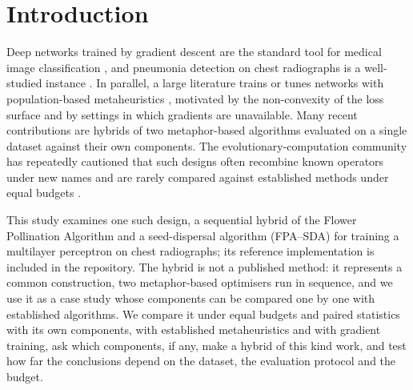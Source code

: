 \documentclass[preprint,12pt]{elsarticle}
\begin{document}
\linenumbers
\section{Introduction}\label{sec:intro}

Deep networks trained by gradient descent are the standard tool for medical image classification \citep{lecun2015deep,litjens2017survey}, and pneumonia detection on chest radiographs is a well-studied instance \citep{kermany2018,rajpurkar2017chexnet}. In parallel, a large literature trains or tunes networks with population-based metaheuristics \citep{ojha2017metaheuristic,stanley2019neuroevolution}, motivated by the non-convexity of the loss surface and by settings in which gradients are unavailable. Many recent contributions are hybrids of two metaphor-based algorithms evaluated on a single dataset against their own components. The evolutionary-computation community has repeatedly cautioned that such designs often recombine known operators under new names and are rarely compared against established methods under equal budgets \citep{sorensen2015metaphor,aranha2022callforaction,camacho2023exposing}.

This study examines one such design, a sequential hybrid of the Flower Pollination Algorithm \citep{yang2012fpa} and a seed-dispersal algorithm (FPA--SDA) for training a multilayer perceptron on chest radiographs; its reference implementation is included in the repository. The hybrid is not a published method: it represents a common construction, two metaphor-based optimisers run in sequence, and we use it as a case study whose components can be compared one by one with established algorithms. We compare it under equal budgets and paired statistics with its own components, with established metaheuristics and with gradient training, ask which components, if any, make a hybrid of this kind work, and test how far the conclusions depend on the dataset, the evaluation protocol and the budget.
\end{document}
